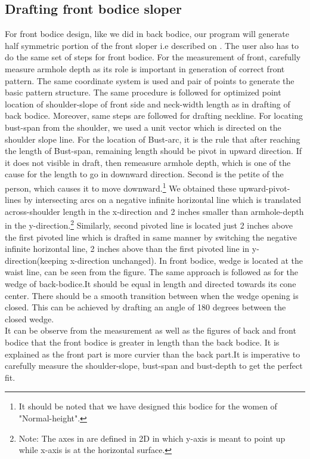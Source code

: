 \documentclass[10pt,letterpaper]{ltugboat}
\begin{document}
\subsection{Drafting front bodice sloper}
For front bodice design, like we did in back bodice, our program will generate half symmetric portion of the front sloper i.e described on \cite{maddie}. The user also has to do the same set of steps for front bodice. For the measurement of front, carefully measure armhole depth as its role is important in generation of correct front pattern. The same coordinate system is used and pair of points to generate the basic pattern structure. The same procedure is followed for optimized point location of shoulder-slope of front side and neck-width length as in drafting of back bodice. Moreover, same steps are followed for drafting neckline. For locating bust-span from the shoulder, we used a unit vector which is directed on the shoulder slope line. For the location of Bust-arc, it is the rule that after reaching the length of Bust-span, remaining length should be pivot in upward direction. If it does not visible in draft, then remeasure armhole depth, which is one of the cause for the length to go in downward direction. Second is the petite of the person, which causes it to move downward.\footnote{It should be noted that we have designed this bodice for the women of "Normal-height".} We obtained these upward-pivot-lines by intersecting arcs on a negative infinite horizontal line which is translated across-shoulder length in the x-direction and 2 inches smaller than armhole-depth in the y-direction.\footnote{Note: The axes in \MP{} are defined in 2D in which y-axis is meant to point up while x-axis is at the horizontal surface.} Similarly, second pivoted line is located just 2 inches above the first pivoted line which is drafted in same manner by switching the negative infinite horizontal line, 2 inches above than the first pivoted line in y-direction(keeping x-direction unchanged). In front bodice, wedge is located at the waist line, can be seen from the figure. The same approach is followed as for the wedge of back-bodice.It should be equal in length and directed towards its cone center. There should be a smooth transition between when the wedge opening is closed. This can be achieved by drafting an angle of 180 degrees between the closed wedge.
\\It can be observe from the measurement as well as the figures of back and front bodice that the front bodice is greater in length than the back bodice. It is explained as the front part is more curvier than the back part.It is imperative to carefully measure the shoulder-slope, bust-span and bust-depth to get the perfect fit.
\end{document}
